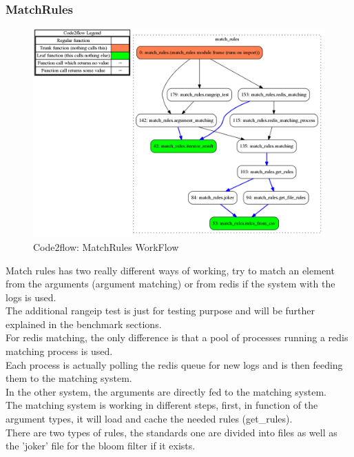 \documentclass{eplmastersthesis}
\begin{document}
\subsubsection{MatchRules}
\begin{figure}[h!]
\begin{center}
	\includegraphics[scale=0.3]{res/flowMatchRules}
	\caption{Code2flow: MatchRules WorkFlow}
	\label{code2flow-matchRules}
\end{center}
\end{figure}

Match rules has two really different ways of working, try to match an element from the arguments (argument matching) or from redis if the system with the logs is used.\\
The additional rangeip test is just for testing purpose and will be further explained in the benchmark sections.\\

For redis matching, the only difference is that a pool of processes running a redis matching process is used.\\
Each process is actually polling the redis queue for new logs and is then feeding them to the matching system.\\
In the other system, the arguments are directly fed to the matching system.\\

The matching system is working in different steps, first, in function of the argument types, it will load and cache the needed rules (get\_rules).\\
There are two types of rules, the standards one are divided into files as well as the 'joker' file for the bloom filter if it exists.
\end{document}
